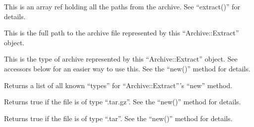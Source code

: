 \documentclass[]{article}
\begin{document}
This is an array ref holding all the paths from the archive. See
``extract()'' for details.


This is the full path to the archive file represented by this
``Archive::Extract'' object.


This is the type of archive represented by this ``Archive::Extract''
object. See accessors below for an easier way to use this. See the
``new()'' method for details.


Returns a list of all known ``types'' for ``Archive::Extract'''s ``new''
method.


Returns true if the file is of type ``.tar.gz''. See the ``new()''
method for details.


Returns true if the file is of type ``.tar''. See the ``new()'' method
for details.
\end{document}
